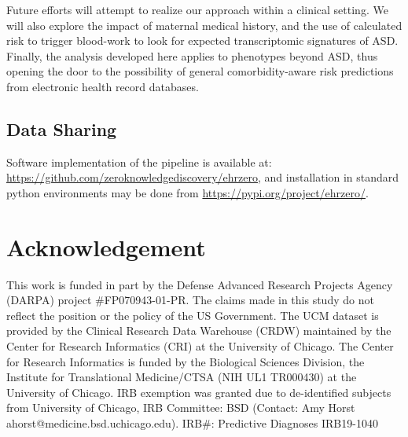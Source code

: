 \documentclass[3p,super,numbers,sort&compress,10pt]{elsarticle}
\begin{document}
Future efforts will attempt to realize our approach within a clinical setting. We will also explore the impact of  maternal medical history, and the  use of calculated risk to trigger   blood-work to look for expected  transcriptomic  signatures of ASD. Finally,  the analysis developed here applies to phenotypes beyond ASD, thus opening the door to the possibility of  general  comorbidity-aware risk predictions  from electronic health record databases.


\subsection*{Data Sharing} Software implementation of the pipeline is available at: \href{https://github.com/zeroknowledgediscovery/ehrzero}{https://github.com/zeroknowledgediscovery/ehrzero}, and installation in standard python environments
may be done from \href{https://pypi.org/project/ehrzero/}{https://pypi.org/project/ehrzero/}.




\def\RIC{\RICTXT}

\def\MXCOL{black}
\def\FXCOL{Orchid3}
\def\MNCOL{SeaGreen4}
\def\FNCOL{SeaGreen4}
\def\NCOL{SeaGreen4}
\def\XCOL{Tomato}
\def\WCOL{Tomato}
\def\YCOL{DodgerBlue4}
\def\TEXTCOL{gray}
\def\AXISCOL{white}






\section*{Acknowledgement}
This work is funded in part by the Defense Advanced Research Projects Agency (DARPA) project \#FP070943-01-PR. The claims made in this study  do not  reflect the position or the policy of the US Government. The UCM dataset is provided by the Clinical Research Data Warehouse (CRDW) maintained by the Center for Research Informatics (CRI) at the  University of Chicago. The Center for Research Informatics is funded by the Biological Sciences Division, the Institute for Translational Medicine/CTSA (NIH UL1 TR000430) at the University of Chicago. IRB exemption was granted due to de-identified subjects from University of Chicago, IRB Committee: BSD (Contact: Amy Horst
ahorst@medicine.bsd.uchicago.edu). IRB\#: Predictive Diagnoses IRB19-1040




%
% 
\end{document}
